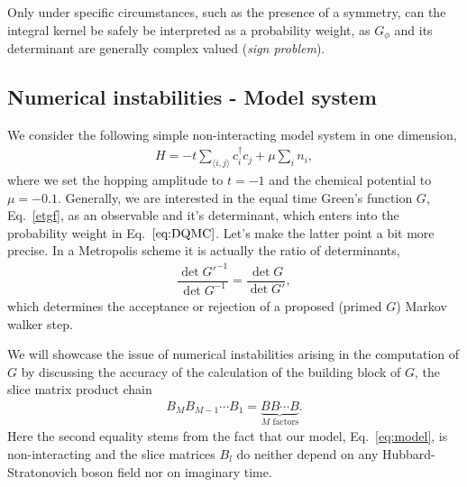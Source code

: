\documentclass[%
 reprint,
superscriptaddress,
showpacs,
 amsmath,amssymb,
 aps,
 prb,
longbibliography,
]{revtex4-1}
\begin{document}
Only under specific circumstances, such as the presence of a symmetry, can the integral kernel be safely be interpreted as a probability weight, as $G_\phi$ and its determinant are generally complex valued (\textit{sign problem}).

\subsection{Numerical instabilities - Model system}

We consider the following simple non-interacting model system in one dimension,
\begin{align}
	H = -t\sum_{\langle i,j \rangle} c_i^\dagger c_j + \mu \sum_i n_i \label{eq:model},
\end{align}
where we set the hopping amplitude to $t=-1$ and the chemical potential to $\mu=-0.1$.
Generally, we are interested in the equal time Green's function $G$, Eq.~\eqref{etgf}, as an observable and it's determinant, which enters into the probability weight in Eq.~$\eqref{eq:DQMC}$. Let's make the latter point a bit more precise. In a Metropolis scheme it is actually the ratio of determinants,
\begin{align}
\dfrac{\det G'^{-1}}{\det G^{-1}} = \dfrac{\det G}{\det G'},
\end{align}
which determines the acceptance or rejection of a proposed (primed $G$) Markov walker step.

We will showcase the issue of numerical instabilities arising in the computation of $G$ by discussing the accuracy of the calculation of the building block of $G$, the slice matrix product chain
\begin{align}
B_M B_{M-1} \cdots B_1 = \underbrace{B B \cdots B}_{M \textrm{ factors}}. \label{eq:Bchain}
\end{align}
Here the second equality stems from the fact that our model, Eq.~\ref{eq:model}, is non-interacting and the slice matrices $B_l$ do neither depend on any Hubbard-Stratonovich boson field nor on imaginary time.
\end{document}
